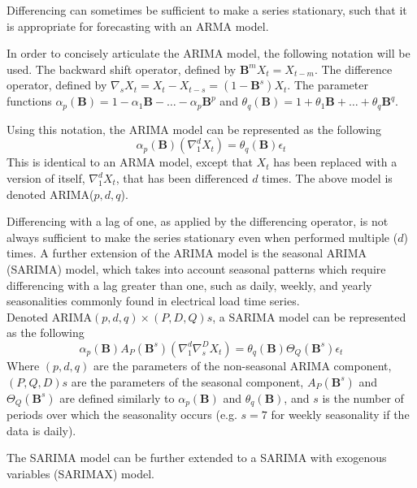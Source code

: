 Differencing can sometimes be sufficient to make a series stationary, such that it is appropriate for forecasting with an ARMA model.
\par
In order to concisely articulate the ARIMA model, the following notation will be used. The backward shift operator, defined by $\textbf{B}^{m}X_{t} = X_{t-m}$. The difference operator, defined by $\nabla_{s} X_{t} = X_{t} - X_{t-s} = (1 - \textbf{B}^{s})X_{t}$. The parameter functions $\alpha_{p}(\textbf{B}) = 1 - \alpha_{1}\textbf{B} - \ldots - \alpha_{p}\textbf{B}^p$ and $\theta_{q}(\textbf{B}) = 1 + \theta_{1}\textbf{B} + \ldots + \theta_{q}\textbf{B}^q$.
\par
Using this notation, the ARIMA model can be represented as the following
\begin{equation}
\alpha_{p}(\textbf{B})(\nabla_{1}^{d}X_{t}) = \theta_{q}(\textbf{B})\epsilon_{t}
\end{equation}
This is identical to an ARMA model, except that $X_{t}$ has been replaced with a  version of itself, $\nabla_{1}^{d}X_{t}$, that has been differenced $d$ times.
The above model is denoted ARIMA($p,d,q$).
\par
Differencing with a lag of one, as applied by the differencing operator, is not always sufficient to make the series stationary even when performed multiple ($d$) times.
A further extension of the ARIMA model is the seasonal ARIMA (SARIMA) model, which takes into account seasonal patterns which require differencing with a lag greater than one, such as daily, weekly, and yearly seasonalities commonly found in electrical load time series.
\\
Denoted ARIMA$(p,d,q)\times(P,D,Q)s$, a SARIMA model can be represented as the following
\begin{equation}
\alpha_{p}(\textbf{B})A_{P}(\textbf{B}^{s})(\nabla_{1}^{d}\nabla_{s}^{D}X_{t}) = \theta_{q}(\textbf{B})\Theta_{Q}(\textbf{B}^{s})\epsilon_{t}
\end{equation}
Where $(p,d,q)$ are the parameters of the non-seasonal ARIMA component, $(P,Q,D)s$ are the parameters of the seasonal component, $A_{P}(\textbf{B}^{s})$ and $\Theta_{Q}(\textbf{B}^{s})$ are defined similarly to $\alpha_{p}(\textbf{B})$ and $\theta_{q}(\textbf{B})$, and $s$ is the number of periods over which the seasonality occurs (e.g. $s=7$ for weekly seasonality if the data is daily).
\par
The SARIMA model can be further extended to a SARIMA with exogenous variables (SARIMAX) model. 

